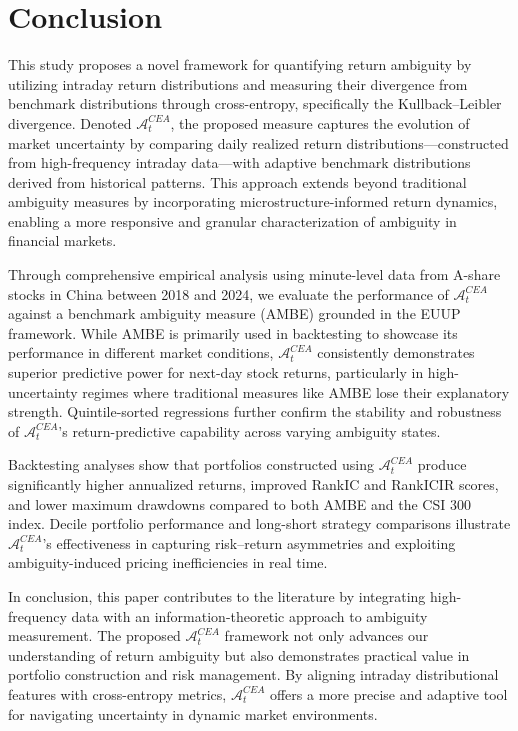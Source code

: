 \documentclass[preprint,12pt,authoryear]{elsarticle}
\begin{document}
\section{Conclusion}
This study proposes a novel framework for quantifying return ambiguity by utilizing intraday return distributions and measuring their divergence from benchmark distributions through cross-entropy, specifically the Kullback–Leibler divergence. Denoted \(\mathcal{A}^{CEA}_t\), the proposed measure captures the evolution of market uncertainty by comparing daily realized return distributions—constructed from high-frequency intraday data—with adaptive benchmark distributions derived from historical patterns. This approach extends beyond traditional ambiguity measures by incorporating microstructure-informed return dynamics, enabling a more responsive and granular characterization of ambiguity in financial markets.

Through comprehensive empirical analysis using minute-level data from A-share stocks in China between 2018 and 2024, we evaluate the performance of \(\mathcal{A}^{CEA}_t\) against a benchmark ambiguity measure (AMBE) grounded in the EUUP framework. While AMBE is primarily used in backtesting to showcase its performance in different market conditions, \(\mathcal{A}^{CEA}_t\) consistently demonstrates superior predictive power for next-day stock returns, particularly in high-uncertainty regimes where traditional measures like AMBE lose their explanatory strength. Quintile-sorted regressions further confirm the stability and robustness of \(\mathcal{A}^{CEA}_t\)'s return-predictive capability across varying ambiguity states.

Backtesting analyses show that portfolios constructed using \(\mathcal{A}^{CEA}_t\) produce significantly higher annualized returns, improved RankIC and RankICIR scores, and lower maximum drawdowns compared to both AMBE and the CSI 300 index. Decile portfolio performance and long-short strategy comparisons illustrate \(\mathcal{A}^{CEA}_t\)'s effectiveness in capturing risk–return asymmetries and exploiting ambiguity-induced pricing inefficiencies in real time.

In conclusion, this paper contributes to the literature by integrating high-frequency data with an information-theoretic approach to ambiguity measurement. The proposed \(\mathcal{A}^{CEA}_t\) framework not only advances our understanding of return ambiguity but also demonstrates practical value in portfolio construction and risk management. By aligning intraday distributional features with cross-entropy metrics, \(\mathcal{A}^{CEA}_t\) offers a more precise and adaptive tool for navigating uncertainty in dynamic market environments.


\end{document}
